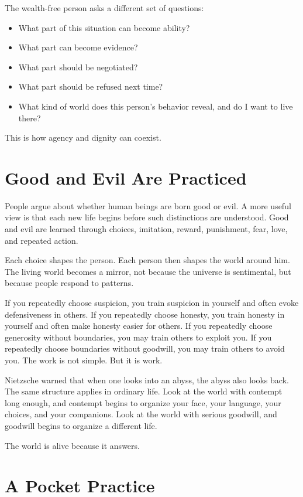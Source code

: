 The wealth-free person asks a different set of questions:

\begin{itemize}
\item What part of this situation can become ability?
\item What part can become evidence?
\item What part should be negotiated?
\item What part should be refused next time?
\item What kind of world does this person's behavior reveal, and do I want to live there?
\end{itemize}

This is how agency and dignity can coexist.

\section*{Good and Evil Are Practiced}

People argue about whether human beings are born good or evil. A more useful view is that each new life begins before such distinctions are understood. Good and evil are learned through choices, imitation, reward, punishment, fear, love, and repeated action.

Each choice shapes the person. Each person then shapes the world around him. The living world becomes a mirror, not because the universe is sentimental, but because people respond to patterns.

If you repeatedly choose suspicion, you train suspicion in yourself and often evoke defensiveness in others. If you repeatedly choose honesty, you train honesty in yourself and often make honesty easier for others. If you repeatedly choose generosity without boundaries, you may train others to exploit you. If you repeatedly choose boundaries without goodwill, you may train others to avoid you. The work is not simple. But it is work.

Nietzsche warned that when one looks into an abyss, the abyss also looks back. The same structure applies in ordinary life. Look at the world with contempt long enough, and contempt begins to organize your face, your language, your choices, and your companions. Look at the world with serious goodwill, and goodwill begins to organize a different life.

The world is alive because it answers.

\section*{A Pocket Practice}

